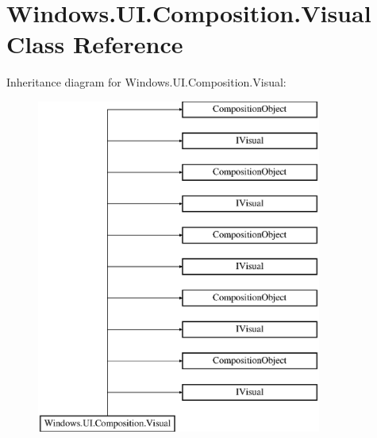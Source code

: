 \hypertarget{class_windows_1_1_u_i_1_1_composition_1_1_visual}{}\section{Windows.\+U\+I.\+Composition.\+Visual Class Reference}
\label{class_windows_1_1_u_i_1_1_composition_1_1_visual}
Inheritance diagram for Windows.\+U\+I.\+Composition.\+Visual\+:\begin{figure}[H]
\begin{center}
\leavevmode
\includegraphics[height=11.000000cm]{class_windows_1_1_u_i_1_1_composition_1_1_visual}
\end{center}
\end{figure}
